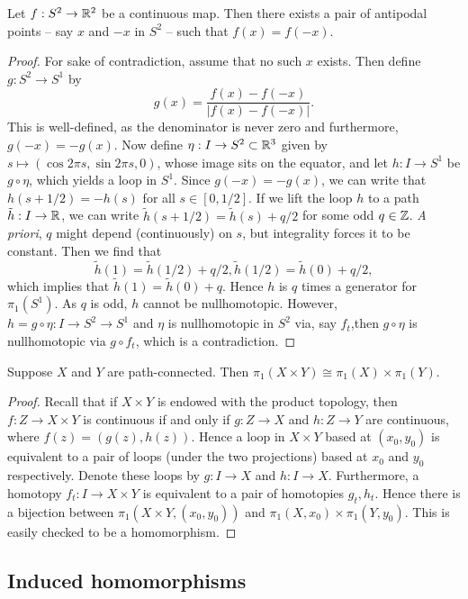 \documentclass{../mathnotes}
\begin{document}
\begin{thm}
    Let $f:S^2\to\mathbb{R}^2$ be a continuous map. Then there exists a pair of antipodal points -- say $x$
    and $-x$ in $S^2$ -- such that $f(x)=f(-x)$.
\end{thm}
\begin{proof}
    For sake of contradiction, assume that no such $x$ exists. Then define $g:S^2\to S^1$ by
    \[g(x)=\frac{f(x)-f(-x)}{|f(x)-f(-x)|}.\]
    This is well-defined, as the denominator is never zero and furthermore, $g(-x)=-g(x)$.
    Now define $\eta:I\to S^2\subset\mathbb{R}^3$ given by $s\mapsto(\cos 2\pi s,\sin 2\pi s,0)$, whose
    image sits on the equator, and let $h:I\to S^1$ be $g\circ\eta$, which yields a loop in $S^1$.
    Since $g(-x)=-g(x)$, we can write that $h(s+1/2)=-h(s)$ for all $s\in [0,1/2]$. If we lift the loop
    $h$ to a path $\tilde h:I\to \mathbb{R}$, we can write $\tilde h(s+1/2)=\tilde h(s)+q/2$ for some
    odd $q\in \mathbb{Z}$. \textit{A priori}, $q$ might depend (continuously) on $s$, but integrality
    forces it to be constant. Then we find that
    \[\tilde h(1)=\tilde h(1/2)+q/2,\tilde h(1/2)=\tilde h(0)+q/2,\]
    which implies that $\tilde h(1)=\tilde h(0)+q$. Hence $h$ is $q$ times a generator for $\pi_1(S^1)$.
    As $q$ is odd, $h$ cannot be nullhomotopic. However, $h=g\circ\eta:I\to S^2\to S^1$ and $\eta$
    is nullhomotopic in $S^2$ via, say $f_t$,then $g\circ\eta$ is nullhomotopic via $g\circ f_t$,
    which is a contradiction.
\end{proof}

\begin{prop}
    Suppose $X$ and $Y$ are path-connected. Then $\pi_1(X\times Y)\cong \pi_1(X)\times\pi_1(Y)$.
\end{prop}
\begin{proof}
    Recall that if $X\times Y$ is endowed with the product topology, then $f:Z\to X\times Y$
    is continuous if and only if $g:Z\to X$ and $h:Z\to Y$ are continuous, where $f(z)=(g(z),h(z))$.
    Hence a loop in $X\times Y$ based at $(x_0,y_0)$ is equivalent to a pair of loops (under
    the two projections) based at $x_0$ and $y_0$ respectively. Denote these loops by
    $g:I\to X$ and $h:I\to X$. Furthermore, a homotopy $f_t:I\to X\times Y$ is equivalent
    to a pair of homotopies $g_t,h_t$. Hence there is a bijection between $\pi_1(X\times Y,(x_0,y_0))$
    and $\pi_1(X,x_0)\times\pi_1(Y,y_0)$. This is easily checked to be a homomorphism.
\end{proof}

\subsection*{Induced homomorphisms}
\end{document}
